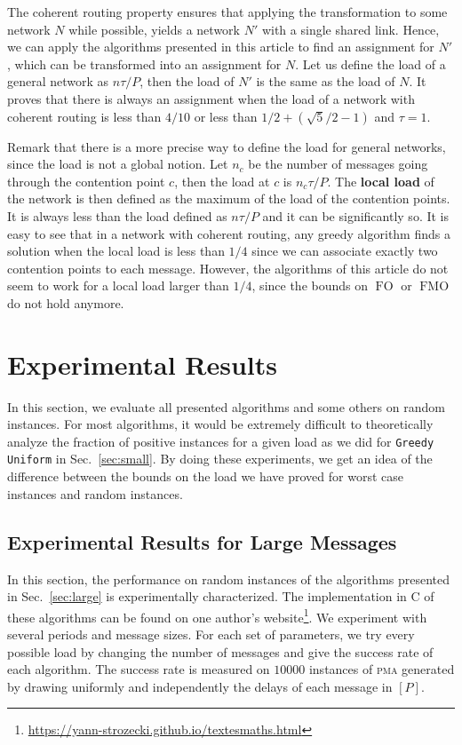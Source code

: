 \documentclass[a4paper,UKenglish,cleveref, autoref, thm-restate]{lipics-v2019}
\DeclareMathOperator{\Fo}{FO}
\DeclareMathOperator{\Fmo}{FMO}
\newcommand\pma{\textsc{pma}\xspace}
\newcommand\greedyuniform{\texttt{Greedy Uniform}\xspace}
\begin{document}
The coherent routing property ensures that applying the transformation to some network $N$ while possible, yields a network $N'$ with a single shared link. Hence, we can apply the algorithms presented in this article to find an assignment for $N'$, which can be transformed into an assignment for $N$. Let us define the load of a general network as $n\tau /P$, then the load of $N'$ is the same as the load of $N$. It proves that there is always an assignment when the load of a network with coherent routing is less than $4/10$ or less than $1/2 + (\sqrt{5}/2 -1)$ and $\tau = 1$. 

Remark that there is a more precise way to define the load for general networks, since the load is not a global notion. 
Let $n_c$ be the number of messages going through the contention point $c$, then the load at $c$ is $n_c\tau/P$. The \textbf{local load} of the network is then defined as the maximum
of the load of the contention points. It is always less than the load defined as $n\tau /P$ and it can be significantly so.
It is easy to see that in a network with coherent routing, any greedy algorithm finds a solution when the local load is less than $1/4$ since we can associate 
exactly two contention points to each message. However, the algorithms of this article do not seem to work for a local load larger than $1/4$, since the bounds on $\Fo$ or $\Fmo$ do not hold anymore. 




\section{Experimental Results}

In this section, we evaluate all presented algorithms and some others on random instances.
For most algorithms, it would be extremely difficult to theoretically analyze the fraction of positive instances for a given load 
as we did for \greedyuniform in Sec.~\ref{sec:small}. By doing these experiments, we get an idea of the difference between the bounds on the load we have proved for worst case
instances and random instances.


\subsection{Experimental Results for Large Messages} \label{sec:perf_large}


In this section, the performance on random instances of the algorithms presented in Sec.~\ref{sec:large} is experimentally characterized. The implementation in C of these algorithms can be found on one author's website\footnote{\url{https://yann-strozecki.github.io/textesmaths.html}}. We experiment with several periods and message sizes. For each set of parameters, we try every possible load by changing the number of messages and give the success rate of each algorithm. The success rate is measured on $10000$ instances of \pma generated by drawing uniformly and independently the delays of each message in $[P]$. 
\end{document}
